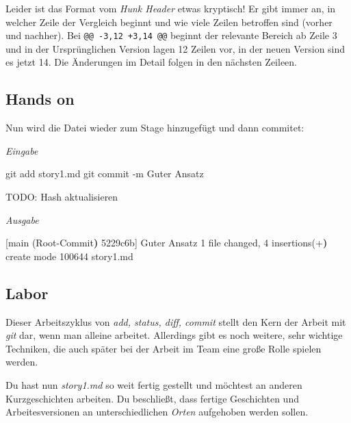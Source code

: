 \documentclass[
  letterpaper,
  DIV=11]{scrreprt}
\newenvironment{Shaded}{\begin{snugshade}}{\end{snugshade}}
\newcommand{\AttributeTok}[1]{\textcolor[rgb]{0.40,0.45,0.13}{#1}}
\newcommand{\ErrorTok}[1]{\textcolor[rgb]{0.68,0.00,0.00}{#1}}
\newcommand{\ExtensionTok}[1]{\textcolor[rgb]{0.00,0.23,0.31}{#1}}
\newcommand{\FunctionTok}[1]{\textcolor[rgb]{0.28,0.35,0.67}{#1}}
\newcommand{\KeywordTok}[1]{\textcolor[rgb]{0.00,0.23,0.31}{\textbf{#1}}}
\newcommand{\NormalTok}[1]{\textcolor[rgb]{0.00,0.23,0.31}{#1}}
\newcommand{\StringTok}[1]{\textcolor[rgb]{0.13,0.47,0.30}{#1}}
\newcommand{\git}{\textit{git}\xspace}
\newcommand{\datei}[1]{\textit{#1}\xspace}
\begin{document}
Leider ist das Format vom \emph{Hunk Header} etwas kryptisch! Er gibt
immer an, in welcher Zeile der Vergleich beginnt und wie viele Zeilen
betroffen sind (vorher und nachher). Bei \texttt{@@\ -3,12\ +3,14\ @@}
beginnt der relevante Bereich ab Zeile 3 und in der Ursprünglichen
Version lagen 12 Zeilen vor, in der neuen Version sind es jetzt 14. Die
Änderungen im Detail folgen in den nächsten Zeileen.

\subsection{Hands on}\label{hands-on}

Nun wird die Datei wieder zum Stage hinzugefügt und dann commitet:

\emph{Eingabe}

\begin{Shaded}
\begin{Highlighting}[]
\FunctionTok{git}\NormalTok{ add story1.md}
\FunctionTok{git}\NormalTok{ commit }\AttributeTok{{-}m} \StringTok{\textquotesingle{}Guter Ansatz\textquotesingle{}}
\end{Highlighting}
\end{Shaded}

TODO: Hash aktualisieren

\emph{Ausgabe}

\begin{Shaded}
\begin{Highlighting}[]
\ExtensionTok{[main} \ErrorTok{(}\ExtensionTok{Root{-}Commit}\KeywordTok{)} \ExtensionTok{5229c6b]}\NormalTok{ Guter Ansatz}
 \ExtensionTok{1}\NormalTok{ file changed, 4 insertions}\ErrorTok{(}\ExtensionTok{+}\KeywordTok{)}
 \ExtensionTok{create}\NormalTok{ mode 100644 story1.md}
\end{Highlighting}
\end{Shaded}

\subsection{Labor}\label{labor-2}

Dieser Arbeitszyklus von \emph{add, status, diff, commit} stellt den
Kern der Arbeit mit \git dar, wenn man alleine arbeitet. Allerdings gibt
es noch weitere, sehr wichtige Techniken, die auch später bei der Arbeit
im Team eine große Rolle spielen werden.

Du hast nun \datei{story1.md} so weit fertig gestellt und möchtest an
anderen Kurzgeschichten arbeiten. Du beschließt, dass fertige
Geschichten und Arbeitesversionen an unterschiedlichen \emph{Orten}
aufgehoben werden sollen.
\end{document}
